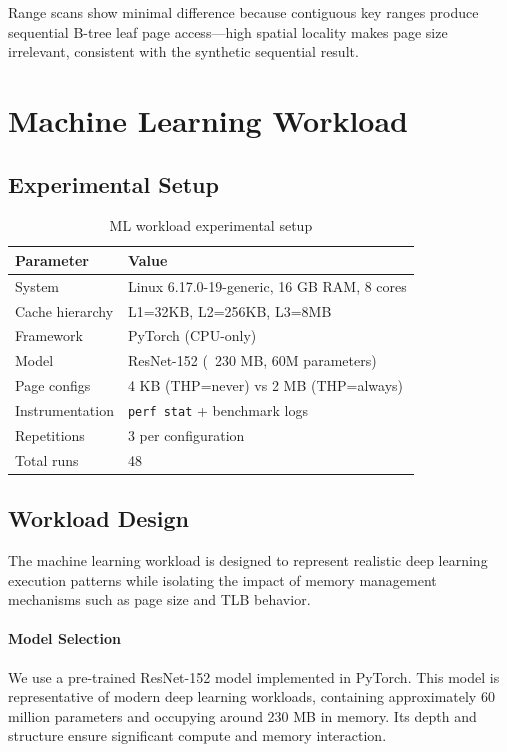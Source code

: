 \documentclass[conference]{IEEEtran}
\begin{document}
Range scans show minimal difference because contiguous key ranges produce sequential B-tree leaf page access---high spatial locality makes page size irrelevant, consistent with the synthetic sequential result.

\section{Machine Learning Workload}

\subsection{Experimental Setup}

\begin{table}[H]
\centering
\begin{tabular}{ll}
\toprule
\textbf{Parameter} & \textbf{Value} \\
\midrule
System & Linux 6.17.0-19-generic, 16 GB RAM, 8 cores \\
Cache hierarchy & L1=32KB, L2=256KB, L3=8MB \\
Framework & PyTorch (CPU-only) \\
Model & ResNet-152 (~230 MB, 60M parameters) \\
Page configs & 4 KB (THP=never) vs 2 MB (THP=always) \\
Instrumentation & \texttt{perf stat} + benchmark logs \\
Repetitions & 3 per configuration \\
Total runs & 48 \\
\bottomrule
\end{tabular}
\caption{ML workload experimental setup}
\end{table}

\subsection{Workload Design}

The machine learning workload is designed to represent realistic deep learning 
execution patterns while isolating the impact of memory management mechanisms 
such as page size and TLB behavior.

\paragraph{Model Selection}
We use a pre-trained ResNet-152 model implemented in PyTorch. This model is 
representative of modern deep learning workloads, containing approximately 
60 million parameters and occupying around 230 MB in memory. Its depth and 
structure ensure significant compute and memory interaction.
\end{document}
